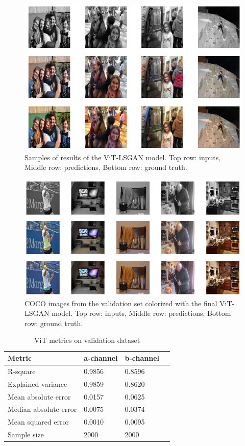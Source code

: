 \documentclass[
]{article}
\begin{document}
\begin{figure}
\centering
\includegraphics{results/FINAL_ViT_generator.png}
\caption{Samples of results of the ViT-LSGAN model. Top row: inputs,
Middle row: predictions, Bottom row: ground truth.}
\label{fig:ViT-LSGAN-results}
\end{figure}

\begin{figure}
\centering
\includegraphics{Project_files/Project_62_1.png}
\caption{COCO images from the validation set colorized with the final
ViT-LSGAN model. Top row: inputs, Middle row: predictions, Bottom row:
ground truth.}
\label{fig:ViT-LSGAN-results-coco}
\end{figure}

\begin{table}\centering\caption[Metrics of the ViT-LSGAN model on validation dataset]{ViT metrics on validation dataset}\label{table:ViT-LSGAN-metrics}\begin{tabular}{llll}\toprule{}                 Metric &              a-channel &             b-channel \\\midrule               R-square &      0.9856 &     0.8596 \\     Explained variance &     0.9859 &    0.8620 \\    Mean absolute error &   0.0157 &   0.0625 \\Median absolute error &   0.0075 &   0.0374 \\Mean squared error &  0.0010 &  0.0095 \\Sample size &                   2000 &                  2000 \\\bottomrule\end{tabular}\end{table}
\end{document}
